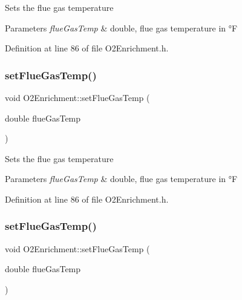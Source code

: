 Sets the flue gas temperature 
\begin{DoxyParams}{Parameters}
{\em flue\+Gas\+Temp} & double, flue gas temperature in °F \\
\hline
\end{DoxyParams}


Definition at line 86 of file O2\+Enrichment.\+h.

\mbox{\label{class_o2_enrichment_a37e625de13b171a6db256a108455aab9}} 
\subsubsection{\texorpdfstring{set\+Flue\+Gas\+Temp()}{setFlueGasTemp()}\hspace{0.1cm}{\footnotesize\ttfamily [2/3]}}
{\footnotesize\ttfamily void O2\+Enrichment\+::set\+Flue\+Gas\+Temp (\begin{DoxyParamCaption}\item[{double}]{flue\+Gas\+Temp }\end{DoxyParamCaption})\hspace{0.3cm}{\ttfamily [inline]}}

Sets the flue gas temperature 
\begin{DoxyParams}{Parameters}
{\em flue\+Gas\+Temp} & double, flue gas temperature in °F \\
\hline
\end{DoxyParams}


Definition at line 86 of file O2\+Enrichment.\+h.

\mbox{\label{class_o2_enrichment_a37e625de13b171a6db256a108455aab9}} 
\subsubsection{\texorpdfstring{set\+Flue\+Gas\+Temp()}{setFlueGasTemp()}\hspace{0.1cm}{\footnotesize\ttfamily [3/3]}}
{\footnotesize\ttfamily void O2\+Enrichment\+::set\+Flue\+Gas\+Temp (\begin{DoxyParamCaption}\item[{double}]{flue\+Gas\+Temp }\end{DoxyParamCaption})\hspace{0.3cm}{\ttfamily [inline]}}

